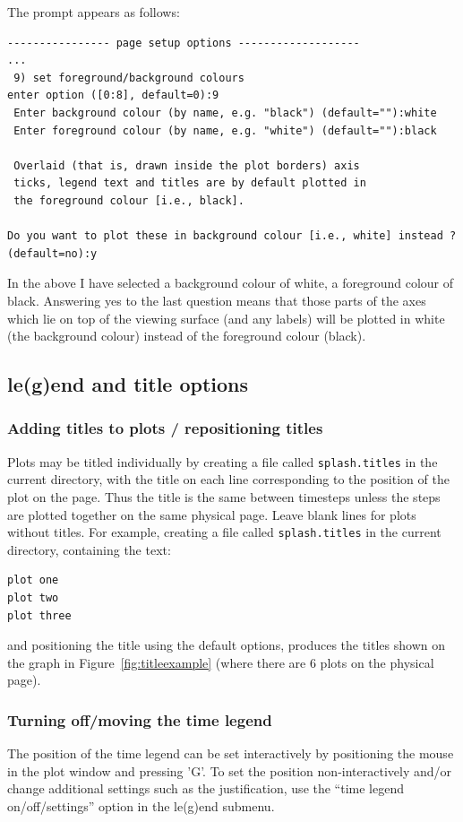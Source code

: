 \documentclass[a4paper,10pt]{article}
\begin{document}
 The prompt appears as follows:
\begin{verbatim}
---------------- page setup options -------------------
...
 9) set foreground/background colours 
enter option ([0:8], default=0):9
 Enter background colour (by name, e.g. "black") (default=""):white
 Enter foreground colour (by name, e.g. "white") (default=""):black

 Overlaid (that is, drawn inside the plot borders) axis 
 ticks, legend text and titles are by default plotted in 
 the foreground colour [i.e., black].

Do you want to plot these in background colour [i.e., white] instead ? (default=no):y
\end{verbatim}
 In the above I have selected a background colour of white, a foreground colour of black. Answering yes to the last question means that those parts of the axes which lie on top of the viewing surface (and any labels) will be plotted in white (the background colour) instead of the foreground colour (black). 
 
\subsection{le(g)end and title options}

\subsubsection{ Adding titles to plots / repositioning titles}
\label{sec:title}
 Plots may be titled individually by creating a file called \verb+splash.titles+ in
the current directory, with the title on each line corresponding to the position
of the plot on the page. Thus the title is the same between timesteps unless the
steps are plotted together on the same physical page. Leave blank lines for
plots without titles. For example, creating a file called \verb+splash.titles+ in
the current directory, containing the text:
\begin{verbatim}
plot one
plot two
plot three
\end{verbatim}
and positioning the title using the default options, produces the titles shown
on the graph in Figure~\ref{fig:titleexample} (where there are 6 plots on the physical page).

\subsubsection{ Turning off/moving the time legend}
\label{sec:legendoff}
 The position of the time legend can be set interactively by positioning the mouse in the plot window and pressing 'G'. To set the position non-interactively and/or change additional settings such as the justification, use the ``time legend on/off/settings'' option in the le(g)end submenu.
\end{document}
